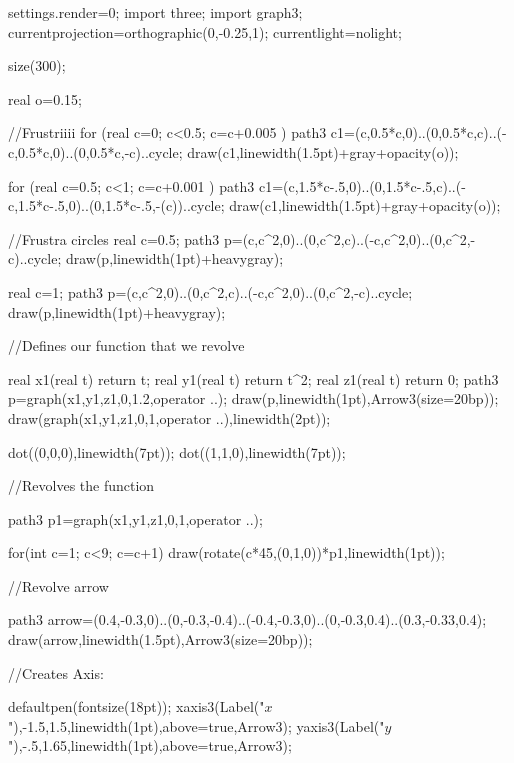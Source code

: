 
  	settings.render=0;
	import three;
    import graph3;
    currentprojection=orthographic(0,-0.25,1);
    currentlight=nolight;

	size(300);
	
	real o=0.15;	
	
	//Frustriiii
	for (real c=0; c<0.5; c=c+0.005 )
	{
		path3 c1=(c,0.5*c,0)..(0,0.5*c,c)..(-c,0.5*c,0)..(0,0.5*c,-c)..cycle;
		draw(c1,linewidth(1.5pt)+gray+opacity(o));
	}
	
	for (real c=0.5; c<1; c=c+0.001 )
	{
		path3 c1=(c,1.5*c-.5,0)..(0,1.5*c-.5,c)..(-c,1.5*c-.5,0)..(0,1.5*c-.5,-(c))..cycle;
		draw(c1,linewidth(1.5pt)+gray+opacity(o));
	}
	
	//Frustra circles
	real c=0.5;
	path3 p=(c,c^2,0)..(0,c^2,c)..(-c,c^2,0)..(0,c^2,-c)..cycle;
	draw(p,linewidth(1pt)+heavygray);
	
	real c=1;
	path3 p=(c,c^2,0)..(0,c^2,c)..(-c,c^2,0)..(0,c^2,-c)..cycle;
	draw(p,linewidth(1pt)+heavygray);  
    
    //Defines our function that we revolve
    
    	real x1(real t) {return t;}
		real y1(real t) {return t^2;}
		real z1(real t) {return 0;}
    	path3 p=graph(x1,y1,z1,0,1.2,operator ..);
        draw(p,linewidth(1pt),Arrow3(size=20bp));
        draw(graph(x1,y1,z1,0,1,operator ..),linewidth(2pt));
        
        dot((0,0,0),linewidth(7pt));
        dot((1,1,0),linewidth(7pt));
        
    //Revolves the function
        
		path3 p1=graph(x1,y1,z1,0,1,operator ..);
        
        for(int c=1; c<9; c=c+1)
        {
        	draw(rotate(c*45,(0,1,0))*p1,linewidth(1pt));
        }
    	
        
    //Revolve arrow
        
    	path3 arrow=(0.4,-0.3,0)..(0,-0.3,-0.4)..(-0.4,-0.3,0)..(0,-0.3,0.4)..(0.3,-0.33,0.4);
		draw(arrow,linewidth(1.5pt),Arrow3(size=20bp));
		
	//Creates Axis:
    
    defaultpen(fontsize(18pt));
    xaxis3(Label("$x$"),-1.5,1.5,linewidth(1pt),above=true,Arrow3);
    yaxis3(Label("$y$"),-.5,1.65,linewidth(1pt),above=true,Arrow3);